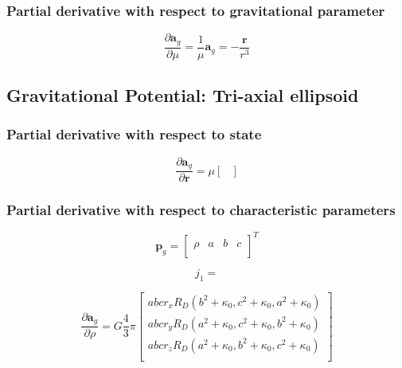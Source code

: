 \subsubsection{Partial derivative with respect to gravitational parameter}
\begin{equation}
    \frac{\partial{\bm{a}_{g}}}{\partial{\mu}} =
    \frac{1}{\mu}\bm{a}_g =
    -\frac{\mathbf{r}}{r^3}
    \label{eq:partial_point_mass_wrt_G}
\end{equation}

\subsection{Gravitational Potential: Tri-axial ellipsoid}
\subsubsection{Partial derivative with respect to state}
\begin{equation}
    \frac{\partial{\bm{a}_{g}}}{\partial{\mathbf{r}}} =
    \mu
    \begin{bmatrix}

    \end{bmatrix}
    \label{eq:partial_triaxial_wrt_state}
\end{equation}

\subsubsection{Partial derivative with respect to characteristic parameters}
\begin{equation}
    \mathbf{p}_{g}=
    \begin{bmatrix}
    \rho & a & b & c \\
    \end{bmatrix}^T
\end{equation}

\begin{equation}
    j_1=
\end{equation}

\begin{equation}
    \frac{\partial{\bm{a}}_g}{\partial{\rho}} =
    G\frac{4}{3}\pi
    \begin{bmatrix}
    {abc}{r_x}{R_D(b^2 + \kappa_0, c^2 + \kappa_0, a^2 + \kappa_0)}\\
    {abc}{r_y}{R_D(a^2 + \kappa_0, c^2 + \kappa_0, b^2 + \kappa_0)}\\
    {abc}{r_z}{R_D(a^2 + \kappa_0, b^2 + \kappa_0, c^2 + \kappa_0)}\\
    \end{bmatrix}
\end{equation}

